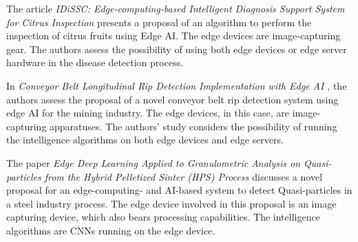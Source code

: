 
The article \textit{IDiSSC: Edge-computing-based Intelligent Diagnosis Support System for Citrus Inspection \cite{iceis21orange}} presents a proposal of an algorithm to perform the inspection of citrus fruits using Edge AI. The edge devices are image-capturing gear. The authors assess the possibility of using both edge devices or edge server hardware in the disease detection process.



In \textit{Conveyor Belt Longitudinal Rip Detection Implementation with Edge AI \cite{Klippel2021}}, the authors assess the proposal of a novel conveyor belt rip detection system using edge AI for the mining industry. The edge devices, in this case, are image-capturing apparatuses. The authors' study considers the possibility of running the intelligence algorithms on both edge devices and edge servers.



The paper \textit{Edge Deep Learning Applied to Granulometric Analysis on Quasi-particles from the Hybrid Pelletized Sinter (HPS) Process \cite{iceis21hps}} discusses a novel proposal for an edge-computing- and AI-based system to detect Quasi-particles in a steel industry process. The edge device involved in this proposal is an image capturing device, which also bears processing capabilities. The intelligence algorithms are CNNs running on the edge device.


